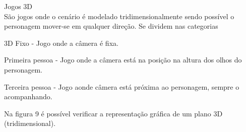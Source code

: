 \begin{figure}[h!]
		\centering
	\end{figure}
	\pagebreak
\begin{alineascomponto}

\item Jogos 3D\\
São jogos onde o cenário é modelado tridimensionalmente sendo possível o personagem mover-se em qualquer direção.
Se dividem nas categorias
\begin{alineascomponto}
\item 3D Fixo - Jogo onde a câmera é fixa.
\item Primeira pessoa - Jogo onde a câmera está na posição na altura dos olhos do personagem.
\item Terceira pessoa - Jogo aonde câmera está próxima ao personagem, sempre o acompanhando. 
\end{alineascomponto}
Na figura 9 é possível verificar a representação gráfica de um plano 3D (tridimensional). \cite{graf}
\end{alineascomponto}
\pagebreak
\begin{figure}[h!]
		\centering
	\end{figure}
	
